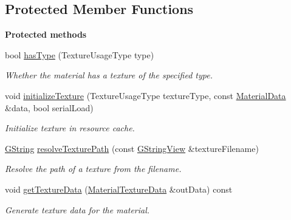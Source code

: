\subsection*{Protected Member Functions}
\begin{Indent}\textbf{ Protected methods}\par
\begin{DoxyCompactItemize}
\item 
\mbox{\label{classrev_1_1_material_ae5ec2019a5b931ddd08aa82def52749a}} 
bool \mbox{\hyperlink{classrev_1_1_material_ae5ec2019a5b931ddd08aa82def52749a}{has\+Type}} (Texture\+Usage\+Type type)
\begin{DoxyCompactList}\small\item\em Whether the material has a texture of the specified type. \end{DoxyCompactList}\item 
\mbox{\label{classrev_1_1_material_afafd75e0fbd55a299e8e8fb05bf20ef2}} 
void \mbox{\hyperlink{classrev_1_1_material_afafd75e0fbd55a299e8e8fb05bf20ef2}{initialize\+Texture}} (Texture\+Usage\+Type texture\+Type, const \mbox{\hyperlink{structrev_1_1_material_data}{Material\+Data}} \&data, bool serial\+Load)
\begin{DoxyCompactList}\small\item\em Initialize texture in resource cache. \end{DoxyCompactList}\item 
\mbox{\hyperlink{classrev_1_1_g_string}{G\+String}} \mbox{\hyperlink{classrev_1_1_material_ab9edd16de4df74b4529ba5b775ad5efe}{resolve\+Texture\+Path}} (const \mbox{\hyperlink{classrev_1_1_g_string_view}{G\+String\+View}} \&texture\+Filename)
\begin{DoxyCompactList}\small\item\em Resolve the path of a texture from the filename. \end{DoxyCompactList}\item 
\mbox{\label{classrev_1_1_material_a5985b241dee151cb83e98cb15bdd522d}} 
void \mbox{\hyperlink{classrev_1_1_material_a5985b241dee151cb83e98cb15bdd522d}{get\+Texture\+Data}} (\mbox{\hyperlink{structrev_1_1_material_texture_data}{Material\+Texture\+Data}} \&out\+Data) const
\begin{DoxyCompactList}\small\item\em Generate texture data for the material. \end{DoxyCompactList}\item 

\end{DoxyCompactItemize}
\end{Indent}
